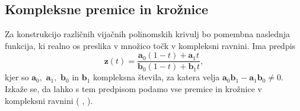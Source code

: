 \documentclass[12pt,a4paper,twoside]{article}
\theoremstyle{definition} %
\theoremstyle{plain} %
\numberwithin{equation}{section}  %
\newcommand{\aV}{\mathbf{a}}
\newcommand{\bV}{\mathbf{b}}
\newcommand{\zV}{\mathbf{z}}
\begin{document}
\subsection{Kompleksne premice in krožnice}
\label{poglavje_kompleksne_premice_kroznice}

Za konstrukcijo različnih vijačnih polinomskih krivulj bo pomembna naslednja funkcija, ki realno os preslika v množico točk v kompleksni ravnini. Ima predpis
\begin{equation}
	\label{transformacija}
	\zV(t)=\frac{\aV_0(1-t)+\aV_1t}{\bV_0(1-t)+\bV_1t},
\end{equation}
kjer so $\aV_0,$ $\aV_1,$ $\bV_0$ in $\bV_1$ kompleksna števila, za katera velja $\aV_0\bV_1-\aV_1\bV_0\neq 0.$ Izkaže se, da lahko s tem predpisom podamo vse premice in krožnice v kompleksni ravnini ( \cite{schwerdtfeger2020geometry}, \cite{needham1998visual}).
\end{document}
